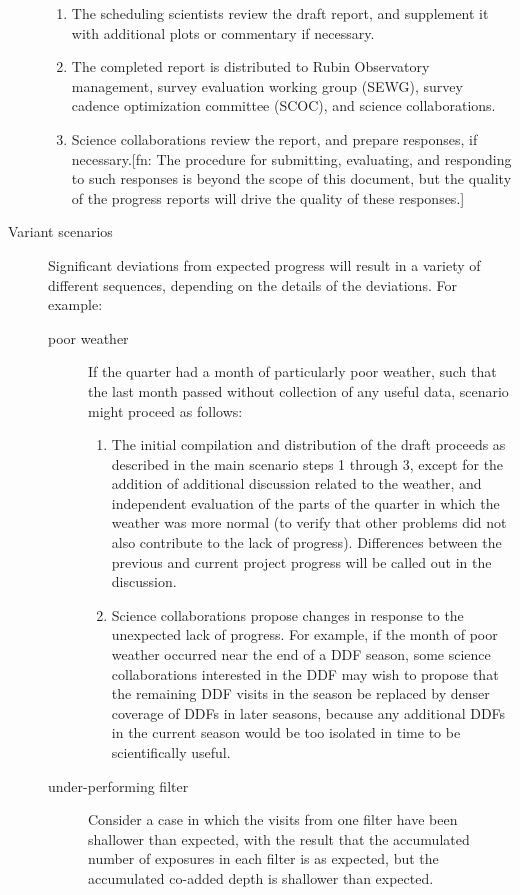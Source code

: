 \begin{description}
\begin{enumerate}
\item The scheduling scientists review the draft report, and supplement it with additional plots or commentary if necessary.
\item The completed report is distributed to Rubin Observatory management, survey evaluation working group (SEWG), survey cadence optimization committee (SCOC), and science collaborations.
\item Science collaborations review the report, and prepare responses, if necessary.[fn: The procedure for submitting, evaluating, and responding to such responses is beyond the scope of this document, but the quality of the progress reports will drive the quality of these responses.]
\end{enumerate}
\item[{Variant scenarios}] Significant deviations from expected progress will result in a variety of different sequences, depending on the details of the deviations. For example:
\begin{description}
\item[{poor weather}] If the quarter had a month of particularly poor weather, such that the last month passed without collection of any useful data, scenario might proceed as follows:
\begin{enumerate}
\item The initial compilation and distribution of the draft proceeds as described in the main scenario steps 1 through 3, except for the addition of additional discussion related to the weather, and independent evaluation of the parts of the quarter in which the weather was more normal (to verify that other problems did not also contribute to the lack of progress). Differences between the previous and current project progress will be called out in the discussion.
\item Science collaborations propose changes in response to the unexpected lack of progress. For example, if the month of poor weather occurred near the end of a DDF season, some science collaborations interested in the DDF may wish to propose that the remaining DDF visits in the season be replaced by denser coverage of DDFs in later seasons, because any additional DDFs in the current season would be too isolated in time to be scientifically useful.
\end{enumerate}
\item[{under-performing filter}] Consider a case in which the visits from one filter have been shallower than expected, with the result that the accumulated number of exposures in each filter is as expected, but the accumulated co-added depth is shallower than expected.

\end{description}
\end{description}

